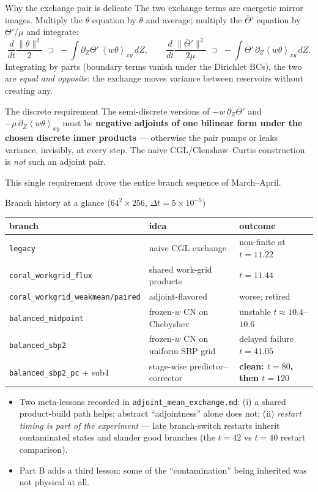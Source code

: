 \documentclass[aspectratio=169,10pt]{beamer}
\newcommand{\Tb}{\overline{\Theta}}
\newcommand{\avexy}[1]{\left\langle #1 \right\rangle_{xy}}
\newcommand{\dZ}{\partial_Z}
\newcommand{\file}[1]{\textcolor{blue!60!black}{\texttt{#1}}}
\begin{document}
\begin{frame}{Why the exchange pair is delicate}
  The two exchange terms are energetic mirror images. Multiply the $\theta$ equation
  by $\theta$ and average; multiply the $\Tb'$ equation by $\Tb'/\mu$ and integrate:
  \[
    \frac{d}{dt}\frac{\|\theta\|^2}{2}\;\supset\; -\int \dZ\Tb'\,\avexy{w\theta}\,dZ,
    \qquad
    \frac{d}{dt}\frac{\|\Tb'\|^2}{2\mu}\;\supset\; -\int \Tb'\,\dZ\avexy{w\theta}\,dZ .
  \]
  Integrating by parts (boundary terms vanish under the Dirichlet BCs), the two are
  \emph{equal and opposite}: the exchange moves variance between reservoirs without
  creating any.
  \begin{alertblock}{The discrete requirement}
    The semi-discrete versions of $-w\,\dZ\Tb'$ and $-\mu\,\dZ\avexy{w\theta}$ must be
    \textbf{negative adjoints of one bilinear form under the chosen discrete inner
    products} --- otherwise the pair pumps or leaks variance, invisibly, at every step.
    The naive CGL/Clenshaw--Curtis construction is \emph{not} such an adjoint pair.
  \end{alertblock}
  This single requirement drove the entire branch sequence of March--April.
\end{frame}

\begin{frame}{Branch history at a glance ($64^2\times256$, $\Delta t = 5\times10^{-5}$)}
  \begin{center}
  \small
  \begin{tabular}{@{}lll@{}}
    \toprule
    branch & idea & outcome \\
    \midrule
    \texttt{legacy} & naive CGL exchange & non-finite at $t=11.22$ \\
    \texttt{coral\_workgrid\_flux} & shared work-grid products & $t=11.44$ \\
    \texttt{coral\_workgrid\_weakmean/paired} & adjoint-flavored & worse; retired \\
    \texttt{balanced\_midpoint} & frozen-$w$ CN on Chebyshev & unstable $t\approx10.4$--$10.6$ \\
    \texttt{balanced\_sbp2} & frozen-$w$ CN on uniform SBP grid & delayed failure $t=41.05$ \\
    \texttt{balanced\_sbp2\_pc} + sub4 & stage-wise predictor--corrector & \textbf{clean: $t=80$, then $t=120$} \\
    \bottomrule
  \end{tabular}
  \end{center}
  \begin{itemize}
    \item Two meta-lessons recorded in \file{adjoint\_mean\_exchange.md}:
      (i) a shared product-build path helps; abstract ``adjointness'' alone does not;
      (ii) \emph{restart timing is part of the experiment} --- late branch-switch
      restarts inherit contaminated states and slander good branches
      (the $t{=}42$ vs $t{=}40$ restart comparison).
    \item Part B adds a third lesson: some of the ``contamination'' being inherited
      was not physical at all.
  \end{itemize}
\end{frame}
\end{document}

